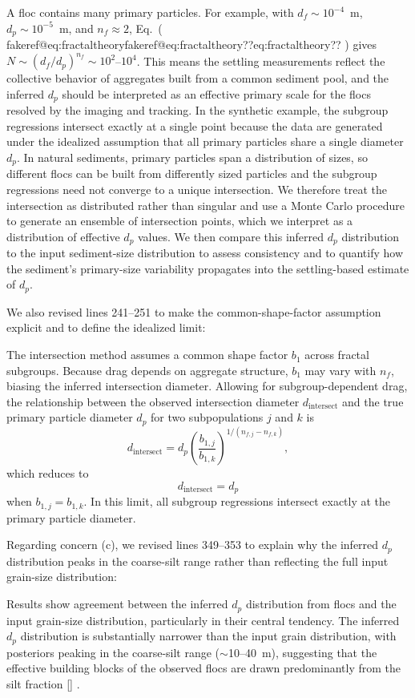 \documentclass[11pt]{article}
\makeatletter
\newenvironment{Snippet}{%
  \par\vspace{0.3em}\begin{list}{}{\setlength{\leftmargin}{1em}\setlength{\rightmargin}{0.5em}}\item\small\itshape
}{%
  \end{list}\vspace{0.3em}
}
\newcommand{\fakeref}[1]{%
  \ifcsname fakeref@#1\endcsname\csname fakeref@#1\endcsname\else ??#1??\fi
}
\renewcommand{\eqref}[1]{(\fakeref{#1})}%
\newcommand{\citelookup}[1]{%
  \ifcsname cite@#1\endcsname\csname cite@#1\endcsname\else #1\fi
}
\newcommand{\citeformat}[1]{%
  \def\citelist{}%
  \forcsvlist{\addtocitelist}{#1}%
  \textup{[\citelist]}%
}
\newcommand{\addtocitelist}[1]{%
  \ifx\citelist\empty
    \edef\citelist{\citelookup{#1}}%
  \else
    \edef\citelist{\citelist;\space\citelookup{#1}}%
  \fi
}
\renewcommand{\cite}[1]{\citeformat{#1}}
\renewcommand{\label}[1]{}%
\makeatother
\begin{document}
\begin{enumerate}[label=\textbf{R3.\arabic*.}]
\begin{Snippet}
A floc contains many primary particles. For example, with $d_f \sim 10^{-4}$~m, $d_p \sim 10^{-5}$~m, and $n_f \approx 2$, Eq.~\eqref{eq:fractaltheory} gives $N \sim (d_f/d_p)^{n_f} \sim 10^{2}$--$10^{4}$. This means the settling measurements reflect the collective behavior of aggregates built from a common sediment pool, and the inferred $d_p$ should be interpreted as an effective primary scale for the flocs resolved by the imaging and tracking. In the synthetic example, the subgroup regressions intersect exactly at a single point because the data are generated under the idealized assumption that all primary particles share a single diameter $d_p$. In natural sediments, primary particles span a distribution of sizes, so different flocs can be built from differently sized particles and the subgroup regressions need not converge to a unique intersection. We therefore treat the intersection as distributed rather than singular and use a Monte Carlo procedure to generate an ensemble of intersection points, which we interpret as a distribution of effective $d_p$ values. We then compare this inferred $d_p$ distribution to the input sediment-size distribution to assess consistency and to quantify how the sediment's primary-size variability propagates into the settling-based estimate of $d_p$.
\end{Snippet}
We also revised lines 241--251 to make the common-shape-factor assumption explicit and to define the idealized limit:
\begin{Snippet}
The intersection method assumes a common shape factor $b_1$ across fractal subgroups. Because drag depends on aggregate structure, $b_1$ may vary with $n_f$, biasing the inferred intersection diameter. Allowing for subgroup-dependent drag, the relationship between the observed intersection diameter $d_\text{intersect}$ and the true primary particle diameter $d_p$ for two subpopulations $j$ and $k$ is
\begin{equation}
d_\text{intersect} = d_p \left( \frac{b_{1,j}}{b_{1,k}} \right)^{1/(n_{f,j} - n_{f,k})},
\label{eq:dpintersection}
\end{equation}
which reduces to
\begin{equation}
d_\text{intersect} = d_p
\label{eq:dpintersectionideal}
\end{equation}
when $b_{1,j}=b_{1,k}$. In this limit, all subgroup regressions intersect exactly at the primary particle diameter.
\end{Snippet}
Regarding concern (c), we revised lines 349--353 to explain why the inferred $d_p$ distribution peaks in the coarse-silt range rather than reflecting the full input grain-size distribution:
\begin{Snippet}
Results show agreement between the inferred $d_p$ distribution from flocs and the input grain-size distribution, particularly in their central tendency. The inferred $d_p$ distribution is substantially narrower than the input grain distribution, with posteriors peaking in the coarse-silt range ($\sim$10--40~\textmu m), suggesting that the effective building blocks of the observed flocs are drawn predominantly from the silt fraction \cite{nghiem2026flocculated}.


\end{Snippet}
\end{enumerate}
\end{document}

